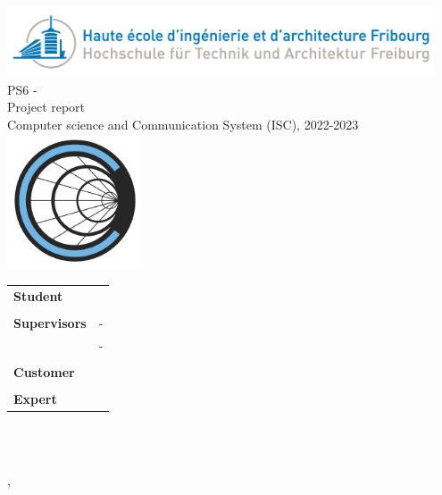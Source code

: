 
\begin{titlepage}
{\selectfont
    \begin{center}
	    \includegraphics[width=0.95\textwidth]{05-resources/img/heiafr_logo}
		~\\[1.5cm]
		{
			\Huge
			PS6 - \ThesisTitle\\Project report \\[0.5cm]
			\large Computer science and Communication System (ISC), 2022-2023\\[2cm]
		}
		\includegraphics[width=0.30\textwidth]{05-resources/img/logo.png}
		~\\[2cm]
		{
			\begin{center}
			\begin{tabularx}{\textwidth} { %
				>{\raggedright\arraybackslash}X
				>{\raggedright\arraybackslash}X  }
					 \textbf{Student} & \Author\\
					 & \\
					 \textbf{Supervisors} & \Advisor \space - \AdvisorSchool \\ & \AdvisorTwo \space - \AdvisorTwoSchool \\
					 & \\
					 \textbf{Customer} & \Mendant\\
					 & \\
					 \textbf{Expert} & \Expert\\
			\end{tabularx}
			\end{center}
			~\\[1.5cm]
		}

		\vfill



	    {\reportVersion}\\
		{\large \Place, \Date}

	\end{center}
}
\restoregeometry
\end{titlepage}




